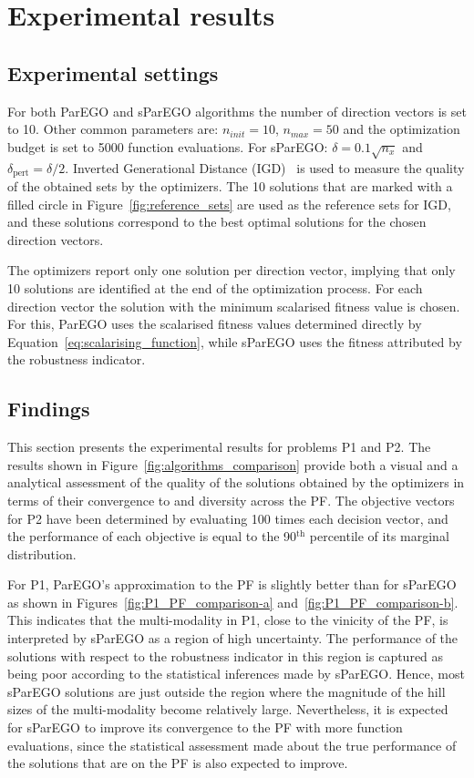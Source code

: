 \documentclass{llncs}
\begin{document}
\section{Experimental results}\label{sec:results}

\subsection{Experimental settings}

For both ParEGO and sParEGO algorithms the number of direction vectors is set to 10. Other common parameters are: $n_{init} = 10$, $n_{max} = 50$ and the optimization budget is set to 5000 function evaluations. For sParEGO: $\delta=0.1 \sqrt{n_x}$ and $\delta_{\text{pert}}=\delta / 2$. Inverted Generational Distance (IGD)~\cite{bib:generational_distance} is used to measure the quality of the obtained sets by the optimizers. The 10 solutions that are marked with a filled circle in Figure~\ref{fig:reference_sets} are used as the reference sets for IGD, and these solutions correspond to the best optimal solutions for the chosen direction vectors. 

The optimizers report only one solution per direction vector, implying that only 10 solutions are identified at the end of the optimization process. For each direction vector the solution with the minimum scalarised fitness value is chosen. For this, ParEGO uses the scalarised fitness values determined directly by Equation~\ref{eq:scalarising_function}, while sParEGO uses the fitness attributed by the robustness indicator.

\subsection{Findings}

This section presents the experimental results for problems P1 and P2. The results shown in Figure~\ref{fig:algorithms_comparison} provide both a visual and a analytical assessment of the quality of the solutions obtained by the optimizers in terms of their convergence to and diversity across the PF. The objective vectors for P2 have been determined by evaluating 100 times each decision vector, and the performance of each objective is equal to the 90$^\textrm{th}$ percentile of its marginal distribution.

For P1, ParEGO's approximation to the PF is slightly better than for sParEGO as shown in Figures~\ref{fig:P1_PF_comparison-a} and~\ref{fig:P1_PF_comparison-b}. This indicates that the multi-modality in P1, close to the vinicity of the PF, is interpreted by sParEGO as a region of high uncertainty. The performance of the solutions with respect to the robustness indicator in this region is captured as being poor according to the statistical inferences made by sParEGO. Hence, most sParEGO solutions are just outside the region where the magnitude of the hill sizes of the multi-modality become relatively large. Nevertheless, it is expected for sParEGO to improve its convergence to the PF with more function evaluations, since the statistical assessment made about the true performance of the solutions that are on the PF is also expected to improve.
\end{document}

